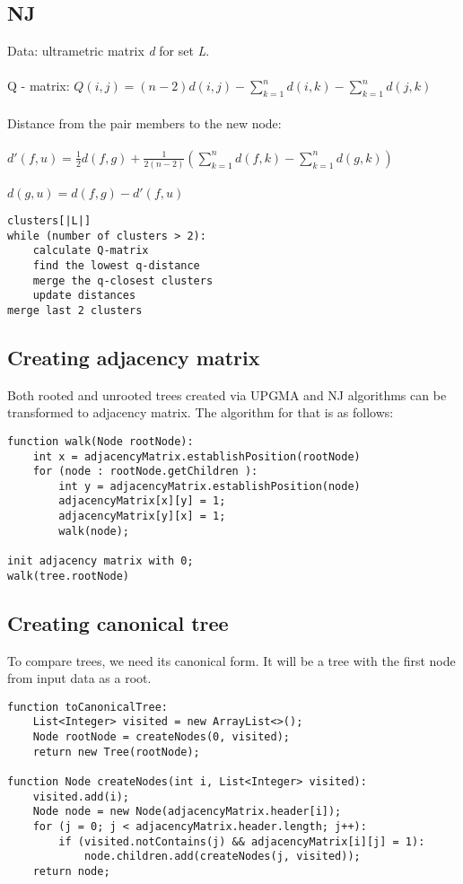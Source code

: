 \documentclass[a4paper,10pt]{article}
\begin{document}
\subsection{NJ}
Data: ultrametric matrix \textit{d} for set \textit{L}.\\ \\
Q - matrix: $ Q(i,j) = (n-2)d(i,j) - \sum_{k=1}^{n} d(i,k) - \sum_{k=1}^{n} d(j,k)$ \\ \\
Distance from the pair members to the new node: \\ \\
$d'(f,u) = \frac{1}{2}d(f,g) + \frac{1}{2(n-2)}(\sum_{k=1}^n d(f,k) - \sum_{k=1}^n d(g,k))$ \\ \\
$d(g,u) = d(f,g) - d'(f,u)$

\begin{lstlisting}[caption={NJ pseudocode}]
clusters[|L|]
while (number of clusters > 2):
    calculate Q-matrix
    find the lowest q-distance
    merge the q-closest clusters
    update distances
merge last 2 clusters
\end{lstlisting}

\subsection{Creating adjacency matrix}
Both rooted and unrooted trees created via UPGMA and NJ algorithms can be transformed to adjacency matrix. The algorithm for that is as follows:
\begin{lstlisting}[caption={Tree to adjacency matrix.}]
function walk(Node rootNode):
    int x = adjacencyMatrix.establishPosition(rootNode)
    for (node : rootNode.getChildren ):
        int y = adjacencyMatrix.establishPosition(node)
        adjacencyMatrix[x][y] = 1;
        adjacencyMatrix[y][x] = 1;
        walk(node);

init adjacency matrix with 0;
walk(tree.rootNode)
\end{lstlisting}

\subsection{Creating canonical tree}
To compare trees, we need its canonical form. It will be a tree with the first node from input data as a root.
\begin{lstlisting}[caption={Tree to adjacency matrix.}]
function toCanonicalTree:
    List<Integer> visited = new ArrayList<>();
    Node rootNode = createNodes(0, visited);
    return new Tree(rootNode);

function Node createNodes(int i, List<Integer> visited):
    visited.add(i);
    Node node = new Node(adjacencyMatrix.header[i]);
    for (j = 0; j < adjacencyMatrix.header.length; j++):
        if (visited.notContains(j) && adjacencyMatrix[i][j] = 1):
            node.children.add(createNodes(j, visited));
    return node;
\end{lstlisting}
\newpage
\end{document}
